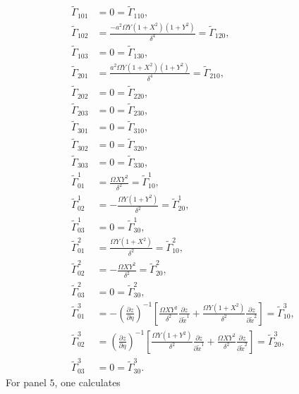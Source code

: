 \documentclass{article}
\begin{document}
\begin{align}
\tilde{\Gamma}_{101}&=0=\tilde{\Gamma}_{110}, \\
\tilde{\Gamma}_{102}&=\frac{-a^2\Omega Y(1+X^2)(1+Y^2)}{\delta^4}=\tilde{\Gamma}_{120}, \\
\tilde{\Gamma}_{103}&=0=\tilde{\Gamma}_{130}, \\
\tilde{\Gamma}_{201}&=\frac{a^2\Omega Y(1+X^2)(1+Y^2)}{\delta^4}=\tilde{\Gamma}_{210}, \\
\tilde{\Gamma}_{202}&=0=\tilde{\Gamma}_{220}, \\
\tilde{\Gamma}_{203}&=0=\tilde{\Gamma}_{230}, \\
\tilde{\Gamma}_{301}&=0=\tilde{\Gamma}_{310}, \\
\tilde{\Gamma}_{302}&=0=\tilde{\Gamma}_{320}, \\
\tilde{\Gamma}_{303}&=0=\tilde{\Gamma}_{330}, \\
\tilde{\Gamma}^1_{01}&=\frac{\Omega XY^2}{\delta^2}=\tilde{\Gamma}^1_{10}, \\
\tilde{\Gamma}^1_{02}&=-\frac{\Omega Y(1+Y^2)}{\delta^2}=\tilde{\Gamma}^1_{20}, \\
\tilde{\Gamma}^1_{03}&=0=\tilde{\Gamma}^1_{30}, \\
\tilde{\Gamma}^2_{01}&=\frac{\Omega Y(1+X^2)}{\delta^2}=\tilde{\Gamma}^2_{10}, \\
\tilde{\Gamma}^2_{02}&=-\frac{\Omega XY^2}{\delta^2}=\tilde{\Gamma}^2_{20}, \\
\tilde{\Gamma}^2_{03}&=0=\tilde{\Gamma}^2_{30}, \\
\tilde{\Gamma}^3_{01}&=-\left(\frac{\partial z}{\partial \eta}\right)^{-1}\left[ \frac{\Omega XY^2}{\delta^2} \frac{\partial z}{\partial \tilde{x}^1}+ \frac{\Omega Y(1+X^2)}{\delta^2} \frac{\partial z}{\partial \tilde{x}^2}  \right]=\tilde{\Gamma}^3_{10}, \\
\tilde{\Gamma}^3_{02}&=\left(\frac{\partial z}{\partial \eta}\right)^{-1}\left[ \frac{\Omega Y(1+Y^2)}{\delta^2} \frac{\partial z}{\partial \tilde{x}^1}+\frac{\Omega XY^2}{\delta^2}\frac{\partial z}{\partial \tilde{x}^2}  \right]=\tilde{\Gamma}^3_{20}, \\
\tilde{\Gamma}^3_{03}&=0=\tilde{\Gamma}^3_{30}.
\end{align}
For panel $5$, one calculates
\end{document}
